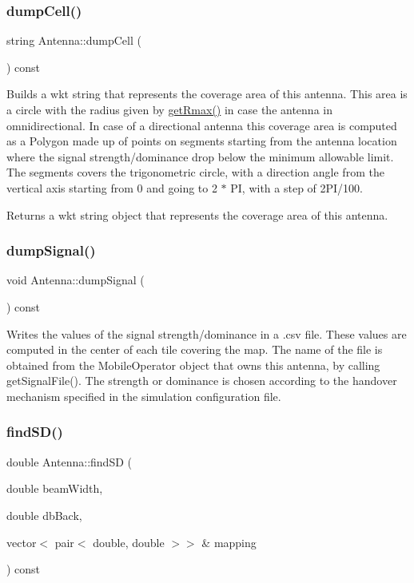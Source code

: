 \subsubsection{\texorpdfstring{dump\+Cell()}{dumpCell()}}
{\footnotesize\ttfamily string Antenna\+::dump\+Cell (\begin{DoxyParamCaption}{ }\end{DoxyParamCaption}) const}

Builds a {\ttfamily wkt} string that represents the coverage area of this antenna. This area is a circle with the radius given by \hyperlink{class_antenna_adf33d1b0be85f95c543a31dc1b3159f5}{get\+Rmax()} in case the antenna in omnidirectional. In case of a directional antenna this coverage area is computed as a Polygon made up of points on segments starting from the antenna location where the signal strength/dominance drop below the minimum allowable limit. The segments covers the trigonometric circle, with a direction angle from the vertical axis starting from 0 and going to 2 $\ast$ PI, with a step of 2\+P\+I/100. \begin{DoxyReturn}{Returns}
a {\ttfamily wkt} string object that represents the coverage area of this antenna. 
\end{DoxyReturn}
\mbox{\label{class_antenna_ad78e7561bf98d891262e6436cd3e1df7}} 
\subsubsection{\texorpdfstring{dump\+Signal()}{dumpSignal()}}
{\footnotesize\ttfamily void Antenna\+::dump\+Signal (\begin{DoxyParamCaption}{ }\end{DoxyParamCaption}) const}

Writes the values of the signal strength/dominance in a .csv file. These values are computed in the center of each tile covering the map. The name of the file is obtained from the Mobile\+Operator object that owns this antenna, by calling get\+Signal\+File(). The strength or dominance is chosen according to the handover mechanism specified in the simulation configuration file. \mbox{\label{class_antenna_affb34fcbb958e09bd48a2c3069e06ac8}} 
\subsubsection{\texorpdfstring{find\+S\+D()}{findSD()}}
{\footnotesize\ttfamily double Antenna\+::find\+SD (\begin{DoxyParamCaption}\item[{double}]{beam\+Width,  }\item[{double}]{db\+Back,  }\item[{vector$<$ pair$<$ double, double $>$$>$ \&}]{mapping }\end{DoxyParamCaption}) const\hspace{0.3cm}{\ttfamily [private]}}

